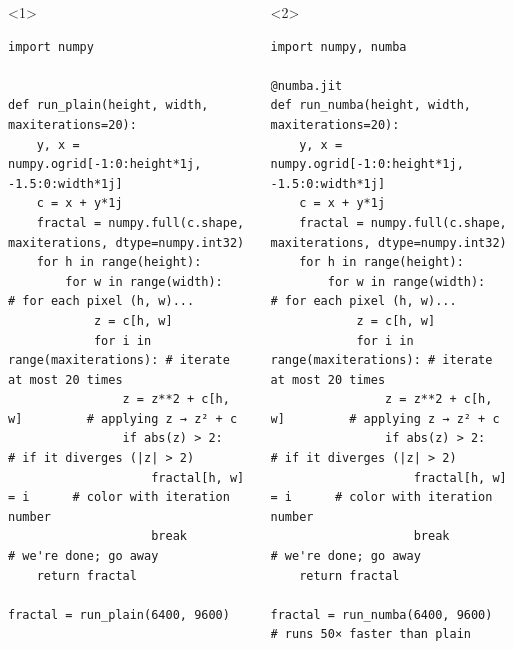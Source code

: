 \documentclass[aspectratio=169]{beamer}
\begin{document}
\begin{frame}[fragile]{}
\begin{columns}
\small
\begin{onlyenv}<1>
\begin{verbatim}
import numpy


def run_plain(height, width, maxiterations=20):
    y, x = numpy.ogrid[-1:0:height*1j, -1.5:0:width*1j]
    c = x + y*1j
    fractal = numpy.full(c.shape, maxiterations, dtype=numpy.int32)
    for h in range(height):
        for w in range(width):             # for each pixel (h, w)...
            z = c[h, w]
            for i in range(maxiterations): # iterate at most 20 times
                z = z**2 + c[h, w]         # applying z → z² + c
                if abs(z) > 2:             # if it diverges (|z| > 2)
                    fractal[h, w] = i      # color with iteration number
                    break                  # we're done; go away
    return fractal

fractal = run_plain(6400, 9600)
\end{verbatim}
\end{onlyenv}
\begin{onlyenv}<2>
\begin{verbatim}
import numpy, numba

@numba.jit
def run_numba(height, width, maxiterations=20):
    y, x = numpy.ogrid[-1:0:height*1j, -1.5:0:width*1j]
    c = x + y*1j
    fractal = numpy.full(c.shape, maxiterations, dtype=numpy.int32)
    for h in range(height):
        for w in range(width):             # for each pixel (h, w)...
            z = c[h, w]
            for i in range(maxiterations): # iterate at most 20 times
                z = z**2 + c[h, w]         # applying z → z² + c
                if abs(z) > 2:             # if it diverges (|z| > 2)
                    fractal[h, w] = i      # color with iteration number
                    break                  # we're done; go away
    return fractal

fractal = run_numba(6400, 9600)            # runs 50× faster than plain
\end{verbatim}
\end{onlyenv}
\end{columns}
\end{frame}
\end{document}
